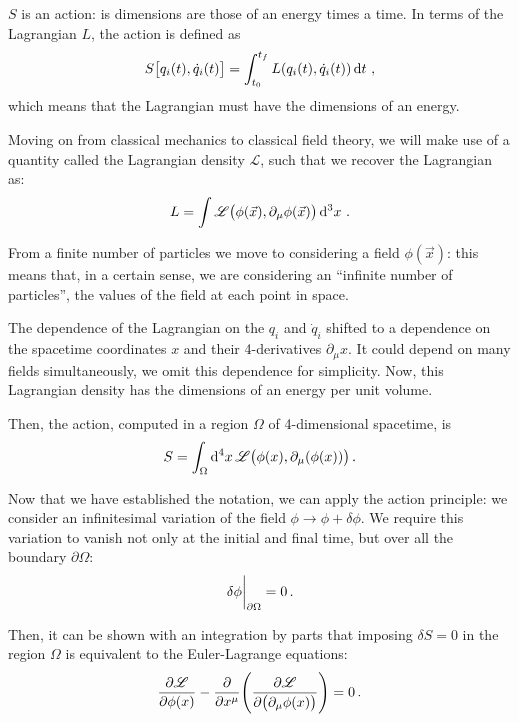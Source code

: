 \documentclass[main.tex]{subfiles}
\begin{document}
\(S\) is an action: is dimensions are those of an energy times a time. 
In terms of the Lagrangian \(L\), the action is defined as 
%
\begin{align}
S \qty[q_i(t), \dot{q}_{i}(t)] = \int_{t_0 }^{t_f} L (q_i (t), \dot{q}_{i}(t)) \dd{t}
\,,
\end{align}
%
which means that the Lagrangian must have the dimensions of an energy. 

Moving on from classical mechanics to classical field theory, we will make use of a quantity called the Lagrangian density \(\mathscr{L}\), such that we recover the Lagrangian as: 
%
\begin{align}
L = \int \mathscr{L} \qty(\phi (\vec{x}), \partial_{\mu } \phi (\vec{x})) \dd[3]{x}
\,.
\end{align}

From a finite number of particles we move to considering a field \(\phi (\vec{x})\): this means that, in a certain sense, we are considering an ``infinite number of particles'', the values of the field at each point in space. 

The dependence of the Lagrangian on the \(q_i\) and \(\dot{q}_{i}\) shifted to a dependence on the spacetime coordinates \(x\) and their 4-derivatives \(\partial_{\mu } x\).
It could depend on many fields simultaneously, we omit this dependence for simplicity.
Now, this Lagrangian density has the dimensions of an energy per unit volume. 

Then, the action, computed in a region \(\Omega \) of 4-dimensional spacetime, is 
%
\begin{align}
S = \int_{\Omega } \dd[4]{x} \mathscr{L} \qty(\phi (x), \partial_{\mu } (\phi (x)))
\,.
\end{align}

Now that we have established the notation, we can apply the action principle: we consider an infinitesimal variation of the field \(\phi \rightarrow \phi  + \delta \phi \). 
We require this variation to vanish not only at the initial and final time, but over all the boundary \(\partial \Omega \): 
%
\begin{align}
\eval{\delta \phi }_{\partial \Omega } =0
\,.
\end{align}

Then, it can be shown with an integration by parts that imposing \(\delta S =0\) in the region \(\Omega \) is equivalent to the Euler-Lagrange equations: 
%
\begin{align}
\pdv{\mathscr{L}}{\phi (x)} - \pdv{}{x^{\mu }} \qty(\pdv{\mathscr{L}}{\qty(\partial_{\mu} \phi (x))}) = 0
\,.
\end{align}
\end{document}
